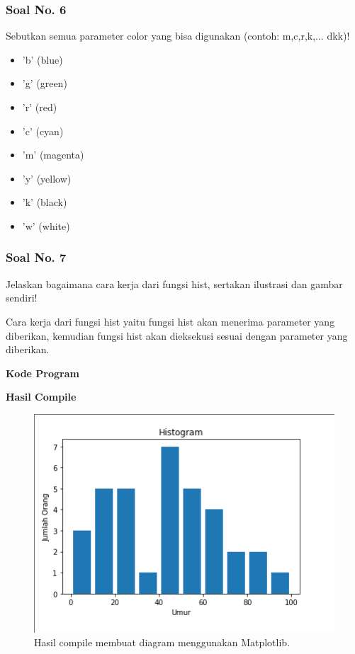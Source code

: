 \subsubsection{Soal No. 6}
\hfill \break
Sebutkan semua parameter color yang bisa digunakan (contoh:  m,c,r,k,...  dkk)!

\begin{itemize}
	\item 'b' (blue)
	\item 'g' (green)
	\item 'r' (red)
	\item 'c' (cyan)
	\item 'm' (magenta)
	\item 'y' (yellow)
	\item 'k' (black)
	\item 'w' (white)
\end{itemize}

\subsubsection{Soal No. 7}
\hfill \break
Jelaskan bagaimana cara kerja dari fungsi hist, sertakan ilustrasi dan gambar sendiri!

\hfill \break
Cara kerja dari fungsi hist yaitu fungsi hist akan menerima parameter yang diberikan, kemudian fungsi hist akan dieksekusi sesuai dengan parameter yang diberikan.

\hfill \break
\textbf{Kode Program}



\hfill \break
\textbf{Hasil Compile}

\begin{figure}[H]
	\includegraphics[width=12cm]{figures/6/1174031/histogram.png}
	\centering
	\caption{Hasil compile membuat diagram menggunakan Matplotlib.}
\end{figure}

